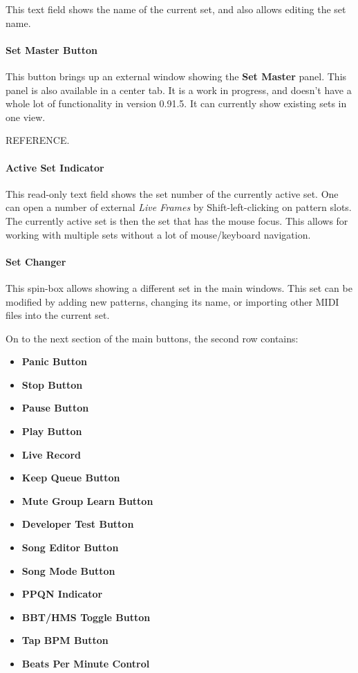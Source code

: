 \documentclass[
 11pt,
 twoside,
 a4paper,
 headinclude,
 footinclude,
 final                                 %
]{article}
\begin{document}
   This text field shows the name of the current set, and also allows editing
   the set name.

\paragraph{Set Master Button}
\label{paragraph:introduction_}

   This button brings up an external window showing the \textbf{Set Master}
   panel.  This panel is also available in a center tab.  It is a work in
   progress, and doesn't have a whole lot of functionality in version
   0.91.5.  It can currently show existing sets in one view.

   REFERENCE.

\paragraph{Active Set Indicator}
\label{paragraph:introduction_}

   This read-only text field shows the set number of the currently active set.
   One can open a number of external \textsl{Live Frames} by
   Shift-left-clicking on pattern slots.  The currently active set is then the
   set that has the mouse focus.  This allows for working with multiple sets
   without a lot of mouse/keyboard navigation.

\paragraph{Set Changer}
\label{paragraph:introduction_}

   This spin-box allows showing a different set in the main windows.
   This set can be modified by adding new patterns, changing its name, or
   importing other MIDI files into the current set.

   On to the next section of the main buttons, the second row contains:

   \begin{itemize}
      \item \textbf{Panic Button}
      \item \textbf{Stop Button}
      \item \textbf{Pause Button}
      \item \textbf{Play Button}
      \item \textbf{Live Record}
      \item \textbf{Keep Queue Button}
      \item \textbf{Mute Group Learn Button}
      \item \textbf{Developer Test Button}
      \item \textbf{Song Editor Button}
      \item \textbf{Song Mode Button}
      \item \textbf{PPQN Indicator}
      \item \textbf{BBT/HMS Toggle Button}
      \item \textbf{Tap BPM Button}
      \item \textbf{Beats Per Minute Control}
   \end{itemize}
\end{document}
